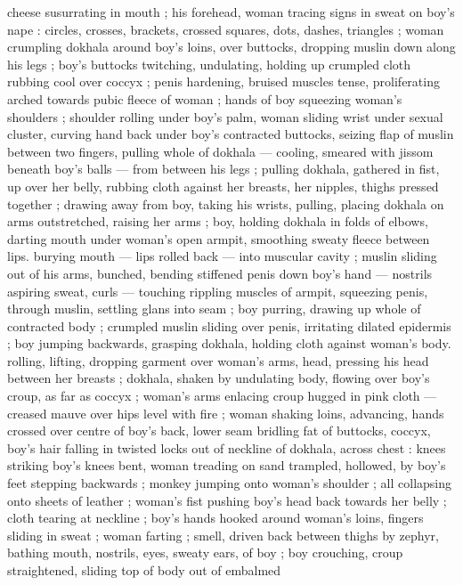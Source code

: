 {cheese susurrating in mouth ; his forehead, woman tracing signs in 
sweat on boy's nape : circles, crosses, brackets, crossed squares, 
dots, dashes, triangles ; woman crumpling dokhala around boy's 
loins, over buttocks, dropping muslin down along his legs ; boy's 
buttocks twitching, undulating, holding up crumpled cloth rubbing 
cool over coccyx ; penis hardening, bruised muscles tense, 
proliferating arched towards pubic fleece of woman ; hands of boy 
squeezing woman's shoulders ; shoulder rolling under boy's palm, 
woman sliding wrist under sexual cluster, curving hand back under 
boy's contracted buttocks, seizing flap of muslin between two 
fingers, pulling whole of dokhala --- cooling, smeared with jissom 
beneath boy's balls --- from between his legs ; pulling dokhala, 
gathered in fist, up over her belly, rubbing cloth against her breasts, 
her nipples, thighs pressed together ; drawing away from boy, taking 
his wrists, pulling, placing dokhala on arms outstretched, raising her 
arms ; boy, holding dokhala in folds of elbows, darting mouth under 
woman's open armpit, smoothing sweaty fleece between lips. 
burying mouth --- lips rolled back --- into muscular cavity ; muslin 
sliding out of his arms, bunched, bending stiffened penis down boy's 
hand --- nostrils aspiring sweat, curls --- touching rippling muscles 
of armpit, squeezing penis, through muslin, settling glans into seam 
; boy purring, drawing up whole of contracted body ; crumpled 
muslin sliding over penis, irritating dilated epidermis ; boy jumping 
backwards, grasping dokhala, holding cloth against woman's body. 
rolling, lifting, dropping garment over woman's arms, head, pressing 
his head between her breasts ; dokhala, shaken by undulating body, 
flowing over boy's croup, as far as coccyx ; woman's arms enlacing 
croup hugged in pink cloth --- creased mauve over hips level with fire 
; woman shaking loins, advancing, hands crossed over centre of 
boy's back, lower seam bridling fat of buttocks, coccyx, boy's hair 
falling in twisted locks out of neckline of dokhala, across chest : 
knees striking boy's knees bent, woman treading on sand trampled, 
hollowed, by boy's feet stepping backwards ; monkey jumping onto 
woman's shoulder ; all collapsing onto sheets of leather ; woman's 
fist pushing boy's head back towards her belly ; cloth tearing at 
neckline ; boy's hands hooked around woman's loins, fingers sliding 
in sweat ; woman farting ; smell, driven back between thighs by 
zephyr, bathing mouth, nostrils, eyes, sweaty ears, of boy ; boy 
crouching, croup straightened, sliding top of body out of embalmed 
}

